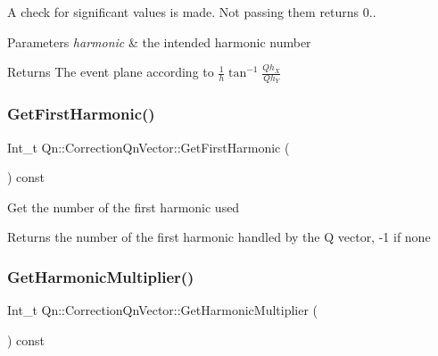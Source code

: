 A check for significant values is made. Not passing them returns 0.. 
\begin{DoxyParams}{Parameters}
{\em harmonic} & the intended harmonic number \\
\hline
\end{DoxyParams}
\begin{DoxyReturn}{Returns}
The event plane according to $\frac{1}{h}\tan^{-1}{\frac{Qh_X}{Qh_Y}}$ 
\end{DoxyReturn}
\mbox{\label{classQn_1_1CorrectionQnVector_ac5110bb9d339c2387e0cfd411c534997}} 
\subsubsection{\texorpdfstring{Get\+First\+Harmonic()}{GetFirstHarmonic()}}
{\footnotesize\ttfamily Int\+\_\+t Qn\+::\+Correction\+Qn\+Vector\+::\+Get\+First\+Harmonic (\begin{DoxyParamCaption}{ }\end{DoxyParamCaption}) const\hspace{0.3cm}{\ttfamily [inline]}}

Get the number of the first harmonic used \begin{DoxyReturn}{Returns}
the number of the first harmonic handled by the Q vector, -\/1 if none 
\end{DoxyReturn}
\mbox{\label{classQn_1_1CorrectionQnVector_a083f96d5886c8ea53681a125043e8150}} 
\subsubsection{\texorpdfstring{Get\+Harmonic\+Multiplier()}{GetHarmonicMultiplier()}}
{\footnotesize\ttfamily Int\+\_\+t Qn\+::\+Correction\+Qn\+Vector\+::\+Get\+Harmonic\+Multiplier (\begin{DoxyParamCaption}{ }\end{DoxyParamCaption}) const\hspace{0.3cm}{\ttfamily [inline]}}

